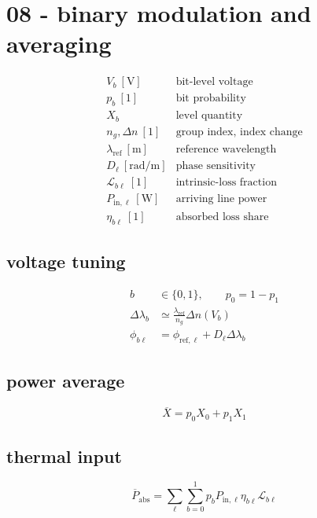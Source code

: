\section*{08 - binary modulation and averaging}

\[
\begin{array}{ll}V_b\ [\mathrm V]&\text{bit-level voltage}\\[0.6em]p_b\ [1]&\text{bit probability}\\[0.6em]X_b&\text{level quantity}\\[0.6em]n_g,\Delta n\ [1]&\text{group index, index change}\\[0.6em]\lambda_{\mathrm{ref}}\ [\mathrm m]&\text{reference wavelength}\\[0.6em]D_\ell\ [\mathrm{rad/m}]&\text{phase sensitivity}\\[0.6em]\mathcal L_{b\ell}\ [1]&\text{intrinsic-loss fraction}\\[0.6em]P_{\mathrm{in},\ell}\ [\mathrm W]&\text{arriving line power}\\[0.6em]\eta_{b\ell}\ [1]&\text{absorbed loss share}\end{array}
\]

\subsection*{voltage tuning}
\[
\displaystyle \begin{aligned}b&\in\{0,1\},\qquad p_0=1-p_1\\\Delta\lambda_b&\simeq\frac{\lambda_{\mathrm{ref}}}{n_g}\Delta n(V_b)\\\phi_{b\ell}&=\phi_{\mathrm{ref},\ell}+D_\ell\Delta\lambda_b\end{aligned}
\]

\subsection*{power average}
\[
\displaystyle \overline X=p_0X_0+p_1X_1
\]

\subsection*{thermal input}
\[
\displaystyle \overline P_{\mathrm{abs}}=\sum_{\ell}\sum_{b=0}^{1}p_bP_{\mathrm{in},\ell}\eta_{b\ell}\mathcal L_{b\ell}
\]
